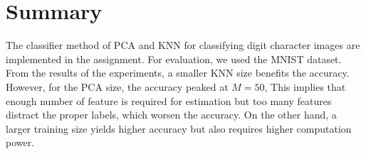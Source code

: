 \documentclass[conference]{IEEEtran}
\begin{document}
\section{Summary} %

The classifier method of PCA and KNN for classifying digit character images are implemented in the assignment. For evaluation, we used the MNIST dataset. From the results of the experiments, a smaller KNN size benefits the accuracy. However, for the PCA size, the accuracy peaked at $M=50$, This implies that enough number of feature is required for estimation but too many features distract the proper labels, which worsen the accuracy. On the other hand, a larger training size yields higher accuracy but also requires higher computation power.







\end{document}
